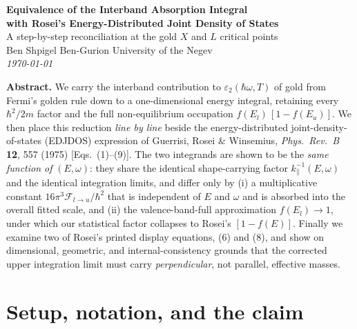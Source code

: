 \documentclass[11pt]{article}
\newcommand{\kpar}{k_{\parallel}}
\newcommand{\hw}{\hbar\omega}
\newcommand{\Flu}{\mathcal{F}_{l\to u}}
\newcommand{\Rq}[1]{\textcolor{roseicol}{\textnormal{(#1)}}}
\begin{document}
\begin{center}
  {\sffamily\bfseries\LARGE\color{workcol}
   Equivalence of the Interband Absorption Integral\\[2pt]
   with Rosei's Energy-Distributed Joint Density of States}\\[8pt]
  {\large A step-by-step reconciliation at the gold $X$ and $L$ critical points}\\[10pt]
  {\normalsize Ben Shpigel \quad\textbullet\quad Ben-Gurion University of the Negev}\\[2pt]
  {\small\itshape \today}
\end{center}

\begin{tcolorbox}[colback=gray!6,colframe=gray!55,boxrule=0.6pt,arc=2pt,
  left=10pt,right=10pt,top=7pt,bottom=7pt]
\small
\textbf{Abstract.} We carry the interband contribution to $\varepsilon_2(\hw,T)$ of gold from
Fermi's golden rule down to a one-dimensional energy integral, retaining every
$\hbar^2/2m$ factor and the full non-equilibrium occupation
$f(E_l)\,[1-f(E_u)]$. We then place this reduction \emph{line by line} beside the
energy-distributed joint-density-of-states (EDJDOS) expression of Guerrisi, Rosei \&
Winsemius, \textit{Phys.\ Rev.\ B} \textbf{12}, 557 (1975) [Eqs.~\Rq{1}--\Rq{9}].
The two integrands are shown to be the \emph{same function of} $(E,\omega)$: they share
the identical shape-carrying factor $\kpar^{-1}(E,\omega)$ and the identical integration
limits, and differ only by (i) a multiplicative constant $16\pi^3\Flu/\hbar^2$ that is
independent of $E$ and $\omega$ and is absorbed into the overall fitted scale, and (ii)
the valence-band-full approximation $f(E_l)\!\to\!1$, under which our statistical factor
collapses to Rosei's $[1-f(E)]$. Finally we examine two of Rosei's printed display
equations, \Rq{6} and \Rq{8}, and show on dimensional, geometric, and internal-consistency
grounds that the corrected upper integration limit must carry \emph{perpendicular}, not
parallel, effective masses.
\end{tcolorbox}

\section{Setup, notation, and the claim}
\label{sec:setup}
\end{document}
